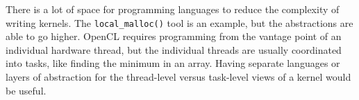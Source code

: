 \documentclass{article}
\begin{document}
There is a lot of space for programming languages to reduce the complexity of writing kernels. The \texttt{local\_malloc()} tool is an example, but the abstractions are able to go higher. OpenCL requires programming from the vantage point of an individual hardware thread, but the individual threads are usually coordinated into tasks, like finding the minimum in an array. Having separate languages or layers of abstraction for the thread-level versus task-level views of a kernel would be useful.



\end{document}
